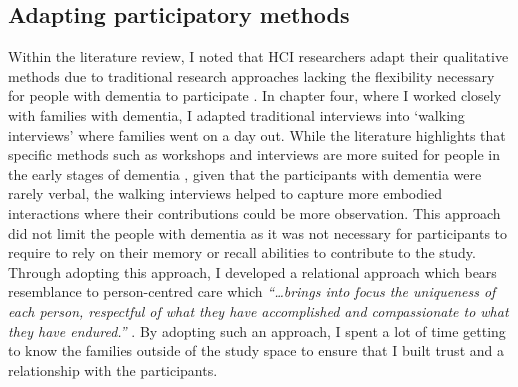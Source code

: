 \subsection{Adapting participatory methods}
\label{AdoptingMethods}
Within the literature review, I noted that HCI researchers adapt their qualitative methods due to traditional research approaches lacking the flexibility necessary for people with dementia to participate \citep{webb2020misfitting}. In chapter four, where I worked closely with families with dementia, I adapted traditional interviews into `walking interviews' \citep{kullberg2017walking} where families went on a day out. While the literature highlights that specific methods such as workshops and interviews are more suited for people in the early stages of dementia \citep{lindsay_empathy_2012}, given that the participants with dementia were rarely verbal, the walking interviews helped to capture more embodied interactions where their contributions could be more observation. This approach did not limit the people with dementia as it was not necessary for participants to require to rely on their memory or recall abilities to contribute to the study. Through adopting this approach, I developed a relational approach which bears resemblance to person-centred care which \textit{``…brings into focus the uniqueness of each person, respectful of what they have accomplished and compassionate to what they have endured.''} \citep{dewing_personhood_2008}. By adopting such an approach, I spent a lot of time getting to know the families outside of the study space to ensure that I built trust and a relationship with the participants. 

